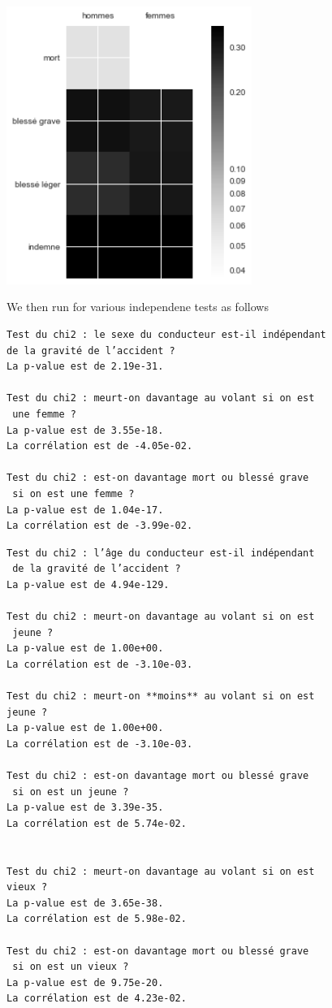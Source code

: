 \documentclass[a4paper]{article}
\theoremstyle{definition}
\theoremstyle{proposition}
\begin{document}
\includegraphics[width=8cm]{colorbar_sex_accident.png}\label{test_sex_accident}

We then run for various independene tests as follows
\begin{verbatim}
Test du chi2 : le sexe du conducteur est-il indépendant 
de la gravité de l’accident ?
La p-value est de 2.19e-31.

Test du chi2 : meurt-on davantage au volant si on est
 une femme ?
La p-value est de 3.55e-18.
La corrélation est de -4.05e-02.

Test du chi2 : est-on davantage mort ou blessé grave
 si on est une femme ?
La p-value est de 1.04e-17.
La corrélation est de -3.99e-02.
\end{verbatim}



\begin{verbatim}
Test du chi2 : l’âge du conducteur est-il indépendant
 de la gravité de l’accident ?
La p-value est de 4.94e-129.

Test du chi2 : meurt-on davantage au volant si on est
 jeune ?
La p-value est de 1.00e+00.
La corrélation est de -3.10e-03.

Test du chi2 : meurt-on **moins** au volant si on est 
jeune ?
La p-value est de 1.00e+00.
La corrélation est de -3.10e-03.

Test du chi2 : est-on davantage mort ou blessé grave
 si on est un jeune ?
La p-value est de 3.39e-35.
La corrélation est de 5.74e-02.


Test du chi2 : meurt-on davantage au volant si on est 
vieux ?
La p-value est de 3.65e-38.
La corrélation est de 5.98e-02.

Test du chi2 : est-on davantage mort ou blessé grave
 si on est un vieux ?
La p-value est de 9.75e-20.
La corrélation est de 4.23e-02.
\end{verbatim}
\end{document}
